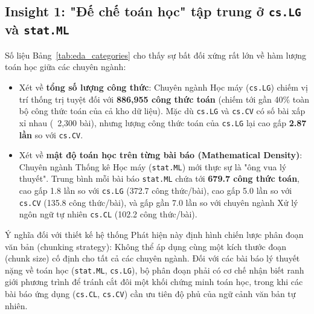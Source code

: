 \subsection{Insight 1: "Đế chế toán học" tập trung ở \texttt{cs.LG} và \texttt{stat.ML}}
Số liệu Bảng~\ref{tab:eda_categories} cho thấy sự bất đối xứng rất lớn về hàm lượng toán học giữa các chuyên ngành:
\begin{itemize}
  \item Xét về \textbf{tổng số lượng công thức}: Chuyên ngành Học máy (\texttt{cs.LG}) chiếm vị trí thống trị tuyệt đối với \textbf{886,955 công thức toán} (chiếm tới gần 40\% toàn bộ công thức toán của cả kho dữ liệu). Mặc dù \texttt{cs.LG} và \texttt{cs.CV} có số bài xấp xỉ nhau (~2,300 bài), nhưng lượng công thức toán của \texttt{cs.LG} lại cao gấp \textbf{2.87 lần} so với \texttt{cs.CV}.
  \item Xét về \textbf{mật độ toán học trên từng bài báo (Mathematical Density)}: Chuyên ngành Thống kê Học máy (\texttt{stat.ML}) mới thực sự là "ông vua lý thuyết". Trung bình mỗi bài báo \texttt{stat.ML} chứa tới \textbf{679.7 công thức toán}, cao gấp 1.8 lần so với \texttt{cs.LG} (372.7 công thức/bài), cao gấp 5.0 lần so với \texttt{cs.CV} (135.8 công thức/bài), và gấp gần 7.0 lần so với chuyên ngành Xử lý ngôn ngữ tự nhiên \texttt{cs.CL} (102.2 công thức/bài).
\end{itemize}

\begin{calloutbox}{Ý nghĩa đối với thiết kế hệ thống}
Phát hiện này định hình chiến lược phân đoạn văn bản (chunking strategy): Không thể áp dụng cùng một kích thước đoạn (chunk size) cố định cho tất cả các chuyên ngành. Đối với các bài báo lý thuyết nặng về toán học (\texttt{stat.ML}, \texttt{cs.LG}), bộ phân đoạn phải có cơ chế nhận biết ranh giới phương trình để tránh cắt đôi một khối chứng minh toán học, trong khi các bài báo ứng dụng (\texttt{cs.CL}, \texttt{cs.CV}) cần ưu tiên độ phủ của ngữ cảnh văn bản tự nhiên.
\end{calloutbox}

